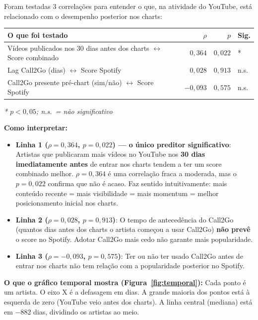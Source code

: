 \documentclass[12pt,a4paper]{article}
\begin{document}
Foram testadas 3 correlações para entender o que, na atividade do YouTube,
está relacionado com o desempenho posterior nos charts:

\medskip
\begin{center}
\begin{tabular}{lrrl}
\toprule
\textbf{O que foi testado} & $\rho$ & $p$ & \textbf{Sig.} \\
\midrule
Vídeos publicados nos 30 dias antes dos charts
  $\leftrightarrow$ Score combinado           & $0{,}364$ & $0{,}022$ & *   \\
Lag Call2Go (dias) $\leftrightarrow$ Score Spotify
                                              & $0{,}028$ & $0{,}913$ & n.s.\\
Call2Go presente pré-chart (sim/não)
  $\leftrightarrow$ Score Spotify             & $-0{,}093$ & $0{,}575$ & n.s.\\
\bottomrule
\end{tabular}
\end{center}
\medskip
\small\textit{* $p < 0{,}05$; n.s.\ = não significativo}\normalsize

\bigskip
\textbf{Como interpretar:}

\begin{itemize}
  \item \textbf{Linha 1 ($\rho = 0{,}364$, $p = 0{,}022$) --- o único
        preditor significativo}: Artistas que publicaram mais vídeos no
        YouTube nos \textbf{30 dias imediatamente antes} de entrar nos charts
        tendem a ter um score combinado melhor. $\rho = 0{,}364$ é uma
        correlação fraca a moderada, mas o $p = 0{,}022$ confirma que não é
        acaso. Faz sentido intuitivamente: mais conteúdo recente = mais
        visibilidade = mais momentum = melhor posicionamento inicial nos
        charts.

  \item \textbf{Linha 2 ($\rho = 0{,}028$, $p = 0{,}913$)}: O tempo de
        antecedência do Call2Go (quantos dias antes dos charts o artista
        começou a usar Call2Go) \textbf{não prevê} o score no Spotify.
        Adotar Call2Go mais cedo não garante mais popularidade.

  \item \textbf{Linha 3 ($\rho = -0{,}093$, $p = 0{,}575$)}: Ter ou não
        ter usado Call2Go antes de entrar nos charts não tem relação com a
        popularidade posterior no Spotify.
\end{itemize}

\textbf{O que o gráfico temporal mostra (Figura~\ref{fig:temporal}):} Cada
ponto é um artista. O eixo X é a defasagem em dias. A grande maioria dos
pontos está à esquerda de zero (YouTube veio antes dos charts). A linha
central (mediana) está em $-882$ dias, dividindo os artistas ao meio.
\end{document}
